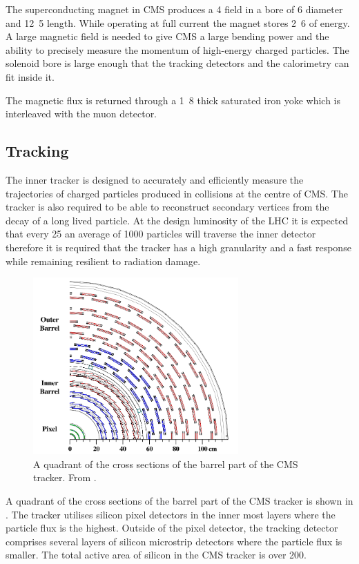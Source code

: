 The superconducting magnet in CMS produces a \unit{4}{\tesla} field in a bore of
\unit{6}{\meter} diameter and \unit{12.5}{\meter} length.  While operating at
full current the magnet stores \unit{2.6}{\giga\joule} of energy.  A large
magnetic field is needed to give CMS a large bending power and the ability to
precisely measure the momentum of high-energy charged particles.  The solenoid
bore is large enough that the tracking detectors and the calorimetry can fit
inside it.\cite{cms}

The magnetic flux is returned through a \unit{1.8}{\meter} thick saturated iron
yoke which is interleaved with the muon detector.

\subsection{Tracking}
The inner tracker is designed to accurately and efficiently measure the
trajectories of charged particles produced in collisions at the centre of CMS.
The tracker is also required to be able to reconstruct secondary vertices from
the decay of a long lived particle.  At the design luminosity of the LHC it
is expected that every \unit{25}{\ns} an average of 1000 particles will traverse
the inner detector therefore it is required that the tracker has a high
granularity and a fast response while remaining resilient to radiation damage. 

\begin{figure}[htbp]
  \centering
  \includegraphics[width=0.7\textwidth]{tracker}
  \caption{A quadrant of the cross sections of the barrel part of the \acs{CMS}
tracker. From \cite{adam}.}
  \label{fig:tracker}
\end{figure}

A quadrant of the cross sections of the barrel part of the \acs{CMS}
tracker is shown in .
The tracker utilises silicon pixel detectors in the inner most layers where the
particle flux is the highest.  Outside of the pixel detector, the tracking
detector comprises several layers of silicon microstrip detectors where the
particle flux is smaller.  The total active area of silicon in the CMS tracker
is over \unit{200}{\meter\squared}.\cite{cms}

